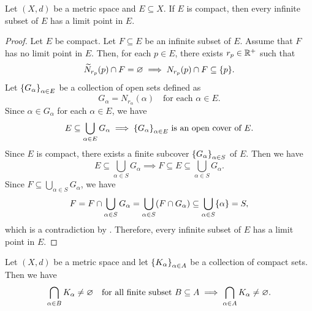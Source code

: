 \bigskip

\begin{theorem} \label{an:thm:infinite-subset-of-compact-set-has-limit-point}
    Let $(X, d)$ be a metric space and $E \subseteq X$. If $E$ is compact,
    then every infinite subset of $E$ has a limit point in $E$.
\end{theorem}

\begin{proof}
    Let $E$ be compact. Let $F \subseteq E$ be an infinite subset of $E$. Assume that $F$ has
    no limit point in $E$. Then, for each $p \in E$, there exists $r_{p} \in \R^{+}$ such that
    \[
    \widetilde{N}_{r_{p}}(p) \cap F = \vnot \implies N_{r_{p}}(p) \cap F \subseteq \set*{p}.
    \]
    Let $\set*{G_{\alpha}}_{\alpha \in E}$ be a collection of open sets defined as
    \[
    G_{\alpha} = N_{r_{\alpha}}(\alpha) \quad \text{for each } \alpha \in E.
    \]
    Since $\alpha \in G_{\alpha}$ for each $\alpha \in E$, we have
    \[
    E \subseteq \bigcup_{\alpha \in E} G_{\alpha} \implies \set*{G_{\alpha}}_{\alpha \in E} \text{ is an open cover of } E.
    \]
    Since $E$ is compact, there exists a finite subcover $\set*{G_{\alpha}}_{\alpha \in S}$ of $E$. Then we have
    \[
    E \subseteq \bigcup_{\alpha \in S} G_{\alpha} \implies F \subseteq E \subseteq \bigcup_{\alpha \in S} G_{\alpha}.
    \]
    Since $F \subseteq \bigcup_{\alpha \in S} G_{\alpha}$, we have
    \[
    F = F \cap \bigcup_{\alpha \in S} G_{\alpha} = \bigcup_{\alpha \in S} \paren*{F \cap G_{\alpha}}
    \subseteq \bigcup_{\alpha \in S} \set*{\alpha} = S,
    \]
    which is a contradiction by .
    Therefore, every infinite subset of $E$ has a limit point in $E$.
\end{proof}

\bigskip

\begin{theorem} \label{an:thm:finite-compact-intersection-property}
    Let $(X, d)$ be a metric space and let $\set*{K_{\alpha}}_{\alpha \in A}$ be a collection of compact sets. Then we have
    \[
    \bigcap_{\alpha \in B} K_{\alpha} \neq \vnot \quad \text{for all finite subset }
    B \subseteq A \implies \bigcap_{\alpha \in A} K_{\alpha} \neq \vnot.
    \]
\end{theorem}

